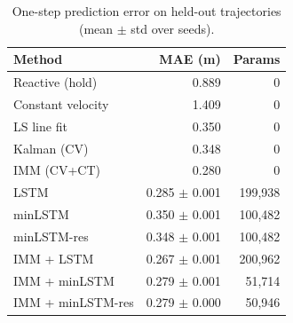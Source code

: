 \begin{table}[t]
\centering
\caption{One-step prediction error on held-out trajectories (mean $\pm$ std over seeds).}\label{tab:accuracy}
\begin{tabular}{lrr}
\toprule
Method & MAE (m) & Params \\
\midrule
Reactive (hold) & 0.889 & 0 \\
Constant velocity & 1.409 & 0 \\
LS line fit & 0.350 & 0 \\
Kalman (CV) & 0.348 & 0 \\
IMM (CV+CT) & 0.280 & 0 \\
LSTM & 0.285 $\pm$ 0.001 & 199,938 \\
minLSTM & 0.350 $\pm$ 0.001 & 100,482 \\
minLSTM-res & 0.348 $\pm$ 0.001 & 100,482 \\
IMM + LSTM & 0.267 $\pm$ 0.001 & 200,962 \\
IMM + minLSTM & 0.279 $\pm$ 0.001 & 51,714 \\
IMM + minLSTM-res & 0.279 $\pm$ 0.000 & 50,946 \\
\bottomrule
\end{tabular}
\end{table}
